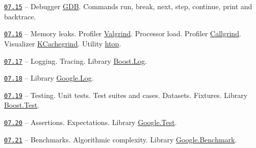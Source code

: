 \documentclass[a4paper,12pt]{article}
\renewenvironment{itemize}
{
    \begin{list}{\labelitemi}
    {
      \setlength{\topsep}{0pt}
      \setlength{\partopsep}{0pt}
      \setlength{\parskip}{0pt}
      \setlength{\itemsep}{0pt}
      \setlength{\parsep}{0pt}
      \setlength{\leftmargin}{14.5pt}
    }
}{\end{list}}
\begin{document}
\medskip\smallskip

\begin{itemize}

    \item \href{https://github.com/i-s-m-mipt/Education/blob/master/projects/examples/source/07.15.cpp}{\texttt{07.15}} -- Debugger \href{https://sourceware.org/gdb/}{GDB}. Commands run, break, next, step, continue, print and backtrace.

    \smallskip

    \item \href{https://github.com/i-s-m-mipt/Education/blob/master/projects/examples/source/07.16.cpp}{\texttt{07.16}} -- Memory leaks. Profiler \href{https://valgrind.org/}{Valgrind}. Processor load. Profiler \href{https://valgrind.org/docs/manual/cl-manual.html}{Callgrind}. Visualizer \href{https://kcachegrind.sourceforge.net/html/Home.html}{KCachegrind}. Utility \href{https://htop.dev/}{htop}.

    \smallskip

    \item \href{https://github.com/i-s-m-mipt/Education/blob/master/projects/examples/source/07.17.cpp}{\texttt{07.17}} -- Logging. Tracing. Library \href{https://www.boost.org/doc/libs/1_84_0/libs/log/doc/html/index.html}{Boost.Log}.

    \smallskip

    \item \href{https://github.com/i-s-m-mipt/Education/blob/master/projects/examples/source/07.18.cpp}{\texttt{07.18}} -- Library \href{https://github.com/google/glog}{Google.Log}.

    \smallskip

    \item \href{https://github.com/i-s-m-mipt/Education/blob/master/projects/examples/source/07.19.cpp}{\texttt{07.19}} -- Testing. Unit tests. Test suites and cases. Datasets. Fixtures. Library \href{https://www.boost.org/doc/libs/1_84_0/libs/test/doc/html/index.html}{Boost.Test}.

    \smallskip

    \item \href{https://github.com/i-s-m-mipt/Education/blob/master/projects/examples/source/07.20.cpp}{\texttt{07.20}} --  Assertions. Expectations. Library \href{https://github.com/google/googletest}{Google.Test}.

    \smallskip

    \item \href{https://github.com/i-s-m-mipt/Education/blob/master/projects/examples/source/07.21.cpp}{\texttt{07.21}} --  Benchmarks. Algorithmic complexity. Library \href{https://github.com/google/benchmark}{Google.Benchmark}.

\end{itemize}
\end{document}
